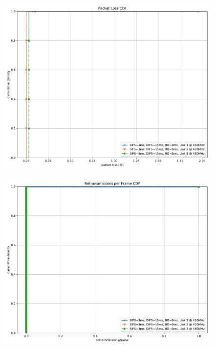 \documentclass{article}
\begin{document}
\begin{figure}
	\includegraphics[width=\textwidth]{no_bo_single/cdf/packet_loss_cdf}
\end{figure}

\begin{figure}
	\includegraphics[width=\textwidth]{no_bo_single/cdf/retransmissions_per_frame_cdf}
\end{figure}
\end{document}
